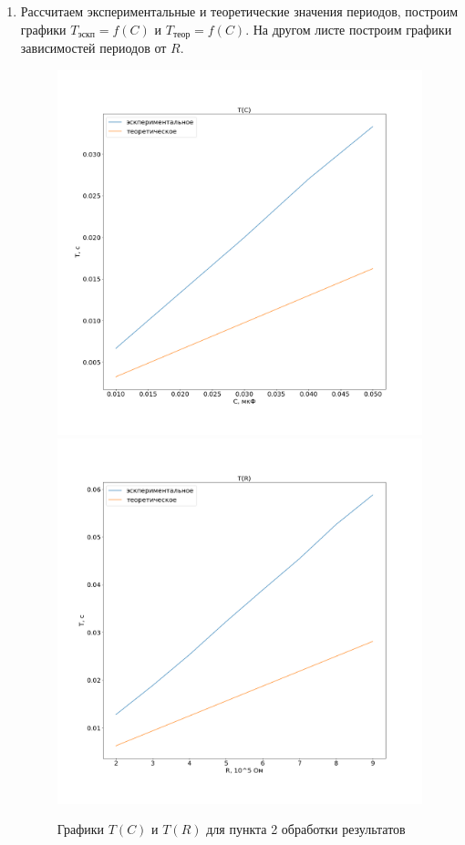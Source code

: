 \documentclass[a4paper, 12pt]{article}
\begin{document}
\begin{enumerate}
        \item Рассчитаем экспериментальные и теоретические значения периодов, построим графики $T_{эскп} = f\left(C\right)$ и $T_{теор} = f\left(C\right)$. На другом листе построим графики зависимостей периодов от $R$.
        \newpage
        \begin{figure}[!h]
            \begin{center}
                \includegraphics[scale=0.3]{graph2.png}
                \includegraphics[scale=0.3]{graph3.png}
                \caption{Графики $T(C)$ и $T(R)$ для пункта 2 обработки результатов}
            \end{center}
        \end{figure}

    \end{enumerate}
\end{document}
